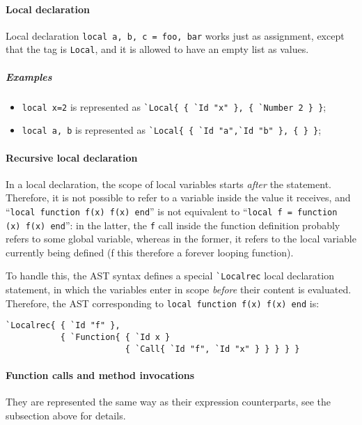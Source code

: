 \paragraph{Local declaration}
Local declaration \verb+local a, b, c = foo, bar+ works just as
assignment, except that the tag is \verb+Local+, and it is allowed to
have an empty list as values.

\subparagraph{Examples}
\begin{itemize}

\item \verb+local x=2+ is represented as
  \verb+`Local{ { `Id "x" }, { `Number 2 } }+;

\item \verb+local a, b+ is represented as
  \verb+`Local{ { `Id "a",`Id "b" }, { } }+;

\end{itemize}

\paragraph{Recursive local declaration}
In a local declaration, the scope of local variables starts {\em
  after} the statement. Therefore, it is not possible to refer to a
variable inside the value it receives, and
``{\tt local function f(x) f(x) end}'' is not equivalent to
``{\tt local f = function (x) f(x) end}'': in the latter, the \verb|f|
call inside the function definition probably refers to some global
variable, whereas in the former, it refers to the local variable
currently being defined (f this therefore a forever looping function).

To handle this, the AST syntax defines a special \verb|`Localrec|
local declaration statement, in which the variables enter in scope
{\em before} their content is evaluated. Therefore, the AST
corresponding to {\tt local function f(x) f(x) end} is:
\begin{verbatim}
`Localrec{ { `Id "f" }, 
           { `Function{ { `Id x } 
                        { `Call{ `Id "f", `Id "x" } } } } }
\end{verbatim}



\paragraph{Function calls and method invocations}
They are represented the same way as their expression counterparts,
see the subsection above for details.

